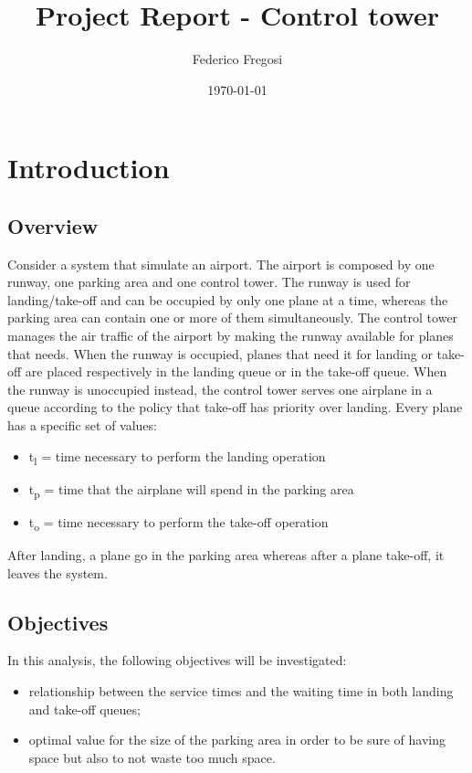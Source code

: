 \documentclass[12pt]{article}
\title{Project Report - Control tower}
\date{\today}
\author{Federico Fregosi}
\begin{document}
\maketitle
\vfill

\tableofcontents
\vfill
\clearpage
\setcounter{page}{1}

\section{Introduction}
\subsection{Overview}
Consider a system that simulate an airport. The airport is composed by one runway, one parking area and one control tower. The runway is used for landing/take-off and can be occupied by only one plane at a time, whereas the parking area can contain one or more of them simultaneously. The control tower manages the air traffic of the airport by making the runway available for planes that needs. When the runway is occupied, planes that need it for landing or take-off are placed respectively in the landing queue or in the take-off queue. When the runway is unoccupied instead, the control tower serves one airplane in a queue according to the policy that take-off has priority over landing. Every plane has a specific set of values:
\begin{itemize}
	\item t\textsubscript{l} = time necessary to perform the landing operation
	\item t\textsubscript{p} = time that the airplane will spend in the parking area
	\item t\textsubscript{o} = time necessary to perform the take-off operation
\end{itemize}
After landing, a plane go in the parking area whereas after a plane take-off, it leaves the system.

\subsection{Objectives}
In this analysis, the following objectives will be investigated:
\begin{itemize}
	\item relationship between the service times and the waiting time in both landing and take-off queues;
	\item optimal value for the size of the parking area in order to be sure of having space but also to not waste too much space.
\end{itemize}
\end{document}
